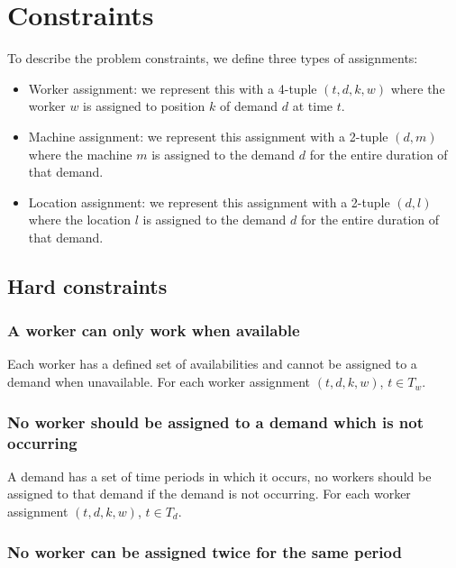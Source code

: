 \documentclass[../thesis.tex]{subfiles}
\begin{document}
\section{Constraints}

To describe the problem constraints, we define three types of assignments:

\begin{itemize}
  \item Worker assignment: we represent this with a 4-tuple $(t, d, k, w)$ where the worker $w$ is assigned to position $k$ of demand $d$ at time $t$.
  \item Machine assignment: we represent this assignment with a 2-tuple $(d, m)$ where the machine $m$ is assigned to the 
        demand $d$ for the entire duration of that demand.
  \item Location assignment: we represent this assignment 
        with a 2-tuple $(d, l)$ where the location $l$ is assigned to the demand $d$ for the entire duration 
        of that demand.
\end{itemize}

\subsection{Hard constraints}

\subsubsection{A worker can only work when available}

Each worker has a defined set of availabilities and cannot be assigned to a demand when 
unavailable.
For each worker assignment $(t, d, k, w)$, $t \in T_w$.

\subsubsection{No worker should be assigned to a demand which is not occurring}

A demand has a set of time periods in which it occurs,
no workers should be assigned to that demand if the demand is not 
occurring. 
For each worker assignment $(t, d, k, w)$, $t \in T_d$.

\subsubsection{No worker can be assigned twice for the same period} 
\end{document}
